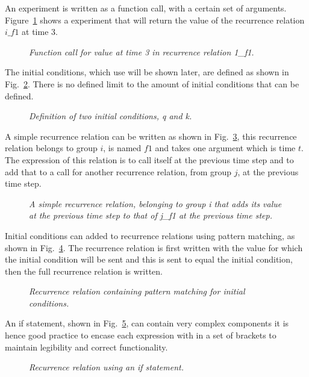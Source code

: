 \documentclass{article}
\begin{document}
An experiment is written as a function call, with a certain set of arguments. Figure~\ref{fig:2exofla} shows a experiment that will return the value of the recurrence relation $i\_f1$ at time $3$.
\begin{figure}[H]
	\centering
	
	\caption{\it Function call for value at time 3 in recurrence relation 1\_f1.}
	\label{fig:2exofla}
\end{figure} 
 
The initial conditions, which use will be shown later, are defined as shown in Fig.~\ref{fig:3exofla}. There is no defined  limit to the amount of initial conditions that can be defined. 
\begin{figure}[H]
	\centering
	
	\caption{\it Definition of two initial conditions, q and k.}
	\label{fig:3exofla}
\end{figure} 
 
A simple recurrence relation can be written as shown in Fig.~\ref{fig:4exofla}, this recurrence relation belongs to group $i$, is named $f1$ and takes one argument which is time $t$. The expression of this relation is to call itself at the previous time step and to add that to a call for another recurrence relation, from group $j$, at the previous time step. 
\begin{figure}[H]
	\centering
	
	\caption{\it A simple recurrence relation, belonging to group i that adds its value at the previous time step to that of j\_f1 at the previous time step.}
	\label{fig:4exofla}
\end{figure} 
 
Initial conditions can added to recurrence relations using pattern matching, as shown in Fig.~\ref{fig:5exofla}. The recurrence relation is first written with the value for which the initial condition will be sent and this is sent to equal the initial condition, then the full recurrence relation is written.  
\begin{figure}[H]
	\centering
	
	\caption{\it Recurrence relation containing pattern matching for initial conditions.}
	\label{fig:5exofla}
\end{figure} 
 
An if statement, shown in Fig.~\ref{fig:6exofla}, can contain very complex components it is hence good practice to encase each expression with in a set of brackets to maintain legibility and correct functionality.  
\begin{figure}[H]
	\centering
	
	\caption{\it Recurrence relation using an if statement.}
	\label{fig:6exofla}
\end{figure} 
 
\end{document}
